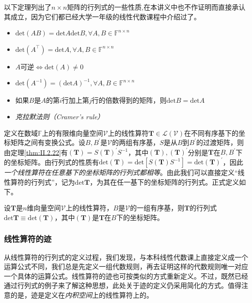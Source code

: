 \documentclass[main.tex]{subfiles}
\begin{document}
以下定理列出了$n\times n$矩阵的行列式的一些性质,在本讲义中也不作证明而直接承认其成立，因为它们都已经大学一年级的线性代数课程中介绍过了。

\begin{theorem}\label{thm:II.2.24}
    \quad
    \begin{itemize}
        \item $\mathrm{det}\left(AB\right)=\mathrm{det}A\mathrm{det}B,\forall A,B\in\mathbb{F}^{n\times n}$
        \item $\mathrm{det}\left(A^\intercal\right)=\mathrm{det}A,\forall A,B\in\mathbb{F}^{n\times n}$
        \item ${A}$可逆$\Leftrightarrow\mathrm{det}\left(A\right)\neq 0$
        \item $\mathrm{det}\left(A^{-1}\right)=\left(\mathrm{det}A\right)^{-1},\forall A,B\in\mathbb{F}^{n\times n}$
        \item 如果$B$是$A$的第$i$行加上第$j$行的倍数得到的矩阵，则$\mathrm{det}B=\mathrm{det}A$

        \item \emph{克拉默法则（Cramer's rule）}\cite[\S1.5]{周胜林2012线性代数}
    \end{itemize}
\end{theorem}

定义在数域$\mathbb{F}$上的有限维向量空间$\mathcal{V}$上的线性算符$\mathbf{T}\in\mathcal{L}\left(\mathcal{V}\right)$在不同有序基下的坐标矩阵之间有变换公式。设$B,B^\prime$是$\mathcal{V}$的两组有序基，$S$是从$B$到$B^\prime$的过渡矩阵，则由定理\ref{thm:II.2.22}有$\left(\mathbf{T}\right)=S\left(\mathbf{T}\right)^\prime S^{-1}$，其中$\left(\mathbf{T}\right),\left(\mathbf{T}\right)^\prime$分别是$\mathbf{T}$在$B,B^\prime$下的坐标矩阵。由行列式的性质有$\mathrm{det}\left(\mathbf{T}\right)=\mathrm{det}\left[S\left(\mathbf{T}\right)S^{-1}\right]=\mathrm{det}\left(\mathbf{T}\right)^\prime$，因此\emph{一个线性算符在任意基下的坐标矩阵的行列式都相等}。由此我们可以直接定义“线性算符的行列式”，记为$\mathrm{det}\mathbf{T}$，为其在任一基下的坐标矩阵的行列式。正式定义如下。

\begin{definition}[线性算符的行列式]\label{def:II.2.18}
    设$\mathbf{T}$是$n$维向量空间$\mathcal{V}$上的线性算符，$B$是$\mathcal{V}$的一组有序基，则$\mathbf{T}$的行列式$\mathrm{det}\mathbf{T}\equiv\mathrm{det}\left(\mathbf{T}\right)$，其中$\left(\mathbf{T}\right)$是$\mathbf{T}$在$B$下的坐标矩阵。
\end{definition}
\subsubsection{线性算符的迹}
从线性算符的行列式的定义过程，我们发现，与本科线性代数课上直接定义成一个运算公式不同，我们总是先定义一组代数规则，再去证明这样的代数规则唯一对应一个具体的运算公式。线性算符的迹也可按类似的方式重新定义。不过，既然已经通过行列式的例子来了解这种思想，此处关于迹的定义仍采用简化的方式。值得注意的是，迹是定义在\emph{内积空间}上的线性算符上的。
\end{document}
